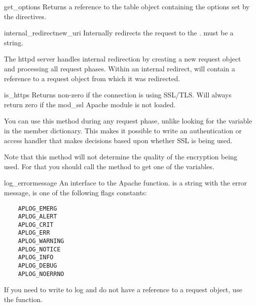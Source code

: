 \begin{methoddesc}[request]{get_options}{}
  Returns a reference to the table object containing the options set by
  the  directives.
\end{methoddesc}

\begin{methoddesc}[request]{internal_redirect}{new_uri}
  Internally redirects the request to the . 
  must be a string.

  The httpd server handles internal redirection by creating a new
  request object and processing all request phases. Within an internal
  redirect,  will contain a reference to a request
  object from which it was redirected.

\end{methoddesc}

\begin{methoddesc}[request]{is_https}{}
  Returns non-zero if the connection is using SSL/TLS. Will always return
  zero if the mod_ssl Apache module is not loaded.

  You can use this method during any request phase, unlike looking for
  the  variable in the  member dictionary.
  This makes it possible to write an authentication or access handler
  that makes decisions based upon whether SSL is being used.

  Note that this method will not determine the quality of the
  encryption being used.  For that you should call the 
  method to get one of the  variables.

\end{methoddesc}

\begin{methoddesc}{log_error}{message}
  An interface to the Apache 
  function.  is a string with the error message,
   is one of the following flags constants:

  \begin{verbatim}
    APLOG_EMERG
    APLOG_ALERT
    APLOG_CRIT
    APLOG_ERR
    APLOG_WARNING
    APLOG_NOTICE
    APLOG_INFO
    APLOG_DEBUG
    APLOG_NOERRNO
  \end{verbatim}            

  If you need to write to log and do not have a reference to a request object,
  use the  function.
\end{methoddesc}

